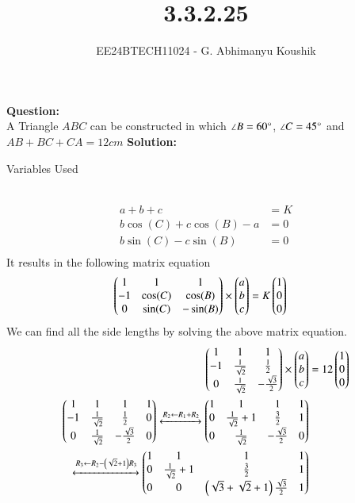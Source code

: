\documentclass[journal]{IEEEtran}
\begin{document}

\vspace{3cm}

\title{3.3.2.25}
\author{EE24BTECH11024 - G. Abhimanyu Koushik
}
{\let\newpage\relax\maketitle}

\renewcommand{\thefigure}{\theenumi}
\renewcommand{\thetable}{\theenumi}
\setlength{\intextsep}{10pt} %

\textbf{Question:}\\
A Triangle $ABC$ can be constructed in which $\angle B=60\degree$, $\angle C=45\degree$ and $AB+BC+CA=12cm$
\textbf{Solution:}
\begin{table}[h!]    
  \centering
  
  \caption{Variables Used}
  \label{tab10.5.3.9.1}
\end{table}\\
\begin{align}
	a+b+c&=K\\
	b\cos(C)+c\cos(B)-a&=0\\
	b\sin(C)-c\sin(B)&=0\\
\end{align}
It results in the following matrix equation
\begin{align}
  \begin{pmatrix}1 & 1 & 1\\-1 & \cos(C) & \cos(B)\\0 & \sin(C) & -\sin(B)\end{pmatrix}\times\begin{pmatrix}a\\b\\c\end{pmatrix}&=K\begin{pmatrix}1\\0\\0\end{pmatrix}
\end{align}
We can find all the side lengths by solving the above matrix equation.
\begin{align}
  \begin{pmatrix}1 & 1 & 1\\-1 & \frac{1}{\sqrt{2}} & \frac{1}{2}\\0 & \frac{1}{\sqrt{2}} & -\frac{\sqrt{3}}{2}\end{pmatrix}\times\begin{pmatrix}a\\b\\c\end{pmatrix}&=12\begin{pmatrix}1\\0\\0\end{pmatrix}\\
  \begin{pmatrix}1 & 1 & 1 & 1\\-1 & \frac{1}{\sqrt{2}} & \frac{1}{2} & 0\\0 & \frac{1}{\sqrt{2}} & -\frac{\sqrt{3}}{2} & 0\end{pmatrix} \xleftrightarrow[]{R_2 \leftarrow {R_1+R_2}}\begin{pmatrix}1 & 1 & 1 & 1\\0 & \frac{1}{\sqrt{2}}+1 & \frac{3}{2} & 1\\0 & \frac{1}{\sqrt{2}} & -\frac{\sqrt{3}}{2} & 0\end{pmatrix}\\
  \xleftrightarrow[]{R_3 \leftarrow {R_2-\ensuremath{\left(\sqrt{2}+1\right)}R_3}}\begin{pmatrix}1 & 1 & 1 & 1\\0 & \frac{1}{\sqrt{2}}+1 & \frac{3}{2} & 1\\0 & 0 & \left(\sqrt{3}+\sqrt{2}+1\right)\frac{\sqrt{3}}{2} & 1\end{pmatrix} 
\end{align}
\end{document}
